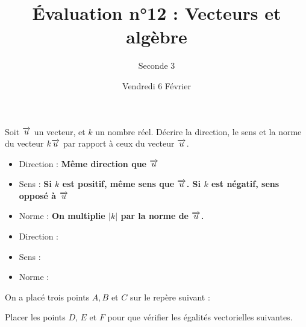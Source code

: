 \documentclass{controle}
\title{Évaluation n°12 : Vecteurs et algèbre}
\author{Seconde 3}
\date{Vendredi 6 Février}
\begin{document}
\titleandname{}
\version

\begin{questions}
\question[3]
Soit $\overrightarrow{u}$ un vecteur, et $k$ un nombre réel. Décrire la direction, le sens et la norme du vecteur $k\overrightarrow{u}$ par rapport à ceux du vecteur $\overrightarrow{u}$.

\ifprintanswers
\begin{itemize}
\item Direction : \textbf{Même direction que $\overrightarrow{u}$} 
\item Sens : \textbf{Si $k$ est positif, même sens que $\overrightarrow{u}$. Si $k$ est négatif, sens opposé à $\overrightarrow{u}$}
\item Norme : \textbf{On multiplie $\left|k\right|$ par la norme de $\overrightarrow{u}$.} 
\end{itemize}
\else
\begin{itemize}
\item Direction :
\item Sens : 
\item Norme :
\end{itemize}
\fi

\question[7]
On a placé trois points $A, B$ et $C$ sur le repère suivant :

\begin{center}
\end{center}
Placer les points $D$, $E$ et $F$ pour que vérifier les égalités vectorielles suivantes.
\end{questions}
\end{document}
